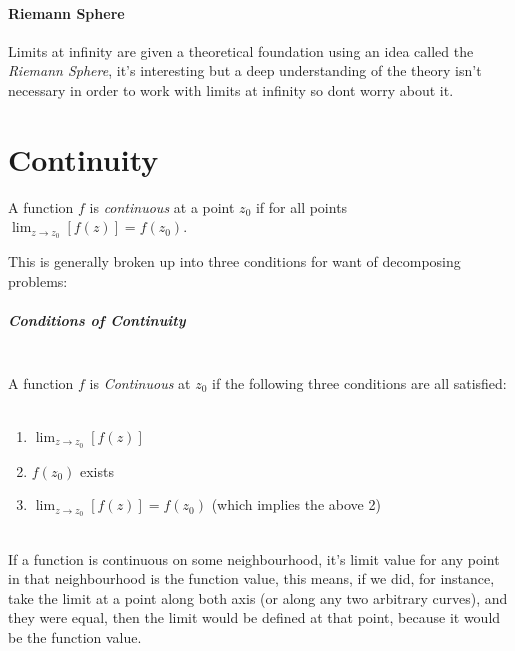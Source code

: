 \documentclass[class=article, crop=false]{standalone}
\begin{document}
\paragraph{Riemann Sphere}
Limits at infinity are given a theoretical foundation using an idea called the \textit{Riemann Sphere}, it's interesting but a deep understanding of the theory isn't necessary in order to work with limits at infinity so dont worry about it.

\newpage

\section{Continuity}
A function $f$ is  \textit{continuous} at a point $z_0$ if for all points $\lim_{z     \rightarrow z_0}\left[ f \left( z \right)  \right] = f \left( z_0 \right) $.

This is generally broken up into three conditions for want of decomposing problems:\\


\hfill\begin{minipage}{\dimexpr\textwidth-3cm}
\begin{tcolorbox}

  \subparagraph{Conditions of Continuity}\ \\
  A function $f$ is \textit{Continuous} at $z_0$ if the following three conditions are all satisfied:
  \ \\
  \begin{enumerate}
    \item $\lim_{z     \rightarrow  z_0}\left[ f \left( z \right)  \right] $ \\
    \item $f \left( z_0 \right) $ exists \\
    \item $\lim_{z     \rightarrow   z_0}\left[ f \left( z \right)  \right] = f \left( z_0 \right) $ {\tiny (which implies the above 2)}
  \end{enumerate}
\end{tcolorbox}

\end{minipage}
\ \\




If a function is continuous on some neighbourhood, it's limit value for any point in that neighbourhood is the function value, this means, if we did, for instance, take the limit at a point along both axis (or along any two arbitrary curves), and they were equal, then the limit would be defined at that point, because it would be the function value.\\
\end{document}

